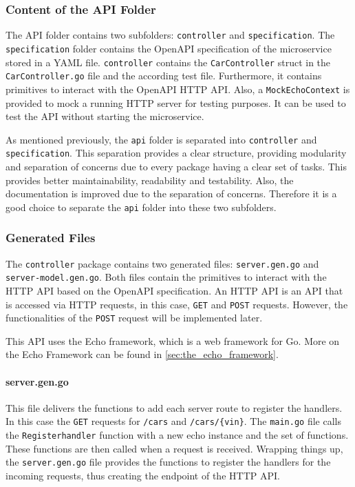 \subsubsection*{Content of the API Folder}
The API folder contains two subfolders: \texttt{controller} and \texttt{specification}. \linebreak
The \texttt{specification} folder contains the OpenAPI specification of the microservice stored in a YAML file.
\texttt{controller} contains the \texttt{CarController} struct in the \texttt{CarController.go} file and the according test file.
Furthermore, it contains primitives to interact with the OpenAPI HTTP API.
Also, a \texttt{MockEchoContext} is provided to mock a running HTTP server for testing purposes.
It can be used to test the API without starting the microservice.

As mentioned previously, the \texttt{api} folder is separated into \texttt{controller} and \texttt{specification}.
This separation provides a clear structure, providing modularity and separation of concerns due to every package having a clear set of tasks.
This provides better maintainability, readability and testability.
Also, the documentation is improved due to the separation of concerns.
Therefore it is a good choice to separate the \texttt{api} folder into these two subfolders.
\subsubsection*{Generated Files}
The \texttt{controller} package contains two generated files: \texttt{server.gen.go} and \hfill \linebreak \texttt{server-model.gen.go}.
Both files contain the primitives to interact with the HTTP API based on the OpenAPI specification.
An HTTP API is an API that is accessed via HTTP requests, in this case, \texttt{GET} and \texttt{POST} requests.
However, the functionalities of the \texttt{POST} request will be implemented later. 

This API uses the Echo framework, which is a web framework for Go.
More on the Echo Framework can be found in \autoref{sec:the_echo_framework}.

\paragraph*{server.gen.go}
This file delivers the functions to add each server route to register the handlers.
In this case the \texttt{GET} requests for \texttt{/cars} and \texttt{/cars/\{vin\}}.
The \texttt{main.go} file calls the \texttt{Registerhandler} function with a new echo instance and the set of functions.
These functions are then called when a request is received.
Wrapping things up, the \texttt{server.gen.go} file provides the functions to register the handlers for the incoming requests, thus creating the endpoint of the HTTP API.

